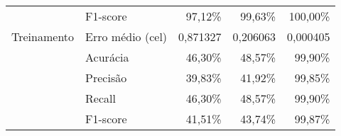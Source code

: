 \begin{table}[ht!]
{\begin{tabular}{l|l|r|r|r}
                                              & F1-score                                            & 97,12\%                                                                                                                & 99,63\%                                                                                                               & 100,00\%                                                         \\
            \multirow{-5}{*}{Treinamento}     & Erro médio (\acrshort{cel})                         & 0,871327                                                                                                               & 0,206063                                                                                                              & 0,000405                                                         \\ \hline
                                              & Acurácia                                            & 46,30\%                                                                                                                & 48,57\%                                                                                                               & 99,90\%                                                          \\
                                              & Precisão                                            & 39,83\%                                                                                                                & 41,92\%                                                                                                               & 99,85\%                                                          \\
                                              & Recall                                              & 46,30\%                                                                                                                & 48,57\%                                                                                                               & 99,90\%                                                          \\
                                              & F1-score                                            & 41,51\%                                                                                                                & 43,74\%                                                                                                               & 99,87\%                                                          \\

\end{tabular}}
\end{table}
